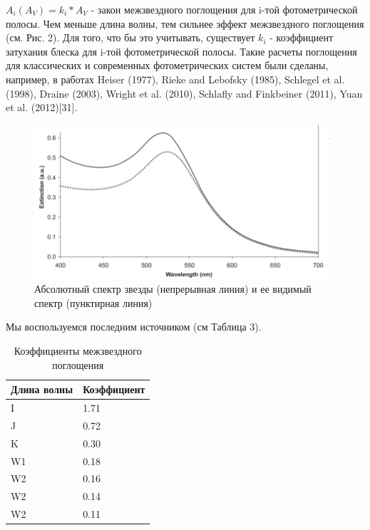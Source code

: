 \documentclass[12pt, a4paper]{article}
\begin{document}
	$A_i(A_V) = k_i*A_V$ - закон межзвездного поглощения для i-той фотометрической полосы. Чем меньше длина волны, тем сильнее эффект межзвездного поглощения (см. Рис. 2). Для того, что бы это учитывать, существует $k_i$ - коэффициент затухания блеска для i-той фотометрической полосы. Такие расчеты поглощения для классических и современных фотометрических систем были сделаны, например, в работах Heiser (1977), Rieke and Lebofsky (1985), Schlegel et al. (1998), Draine (2003), Wright et al. (2010), Schlafly and Finkbeiner (2011), Yuan et al. (2012)[31].
	\begin{figure}[h]
	\centering
	\includegraphics[width=11cm]{extinction}
	\caption{Абсолютный спектр звезды (непрерывная линия) \newline и ее видимый спектр (пунктирная линия)}
	\end{figure}

	Мы воспользуемся последним источником (см Таблица 3).
	\begin{table}[h]
	\centering
	\begin{tabular}{|l|l|}
	\hline
	Длина волны & Коэффициент \\ \hline
	I  & 1.71  \\ \hline
	J  & 0.72  \\ \hline
	K  & 0.30  \\ \hline
	W1 & 0.18  \\ \hline
	W2 & 0.16  \\ \hline
	W2 & 0.14  \\ \hline
	W2 & 0.11  \\ \hline
	\end{tabular}
	\caption{Коэффициенты межзвездного поглощения}
	\end{table}
\end{document}
